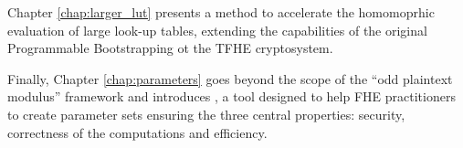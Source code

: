 Chapter \ref{chap:larger_lut} presents a method to accelerate the homomoprhic evaluation of large look-up tables, extending the capabilities of the original Programmable Bootstrapping ot the TFHE cryptosystem.


Finally, Chapter \ref{chap:parameters} goes beyond the scope of the ``odd plaintext modulus'' framework and introduces \toolName, a tool designed to help FHE practitioners to create parameter sets ensuring the three central properties: security, correctness of the computations and efficiency.






 
